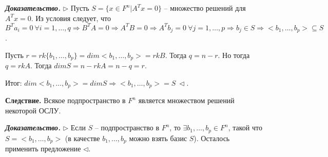 \vspace{\baselineskip}
\textbf{\textit{Доказательство.}} $\rhd$ Пусть $S = \{x \in F^n | A^Tx = 0\}$ -- множество решений для $A^Tx = 0$. Из условия следует, что $B^T a_i = 0 \ \forall i = 1, \dots, q \Rightarrow B^T A = 0 \Rightarrow A^T B = 0 \Rightarrow A^T b_j = 0 \ \forall j = 1, \dots, p \Rightarrow b_j \in S \Rightarrow <b_1, \dots, b_p> \subseteq S$.

Пусть $r = rk \{b_1, \dots, b_p\} = dim <b_1, \dots, b_p> = rkB$. Тогда $q = n - r$. Но тогда $q = rkA$. Тогда $dimS = n - rkA = n - q = r$.

Итог: $dim<b_1, \dots, b_p> = dim S \Rightarrow <b_1, \dots, b_p> = S \ \lhd$.

\vspace{\baselineskip}
\textbf{Следствие.} Всякое подпространство в $F^n$ является множеством решений некоторой ОСЛУ.

\vspace{\baselineskip}
\textbf{\textit{Доказательство.}} $\rhd$ Если $S$ -- подпространство в $F^n$, то $\exists b_1, \dots, b_p \in F^n$, такой что $S = <b_1, \dots, b_p>$ (в качестве $b_1, \dots, b_p$ можно взять базис $S$). Осталось применить предложение $\lhd$.

